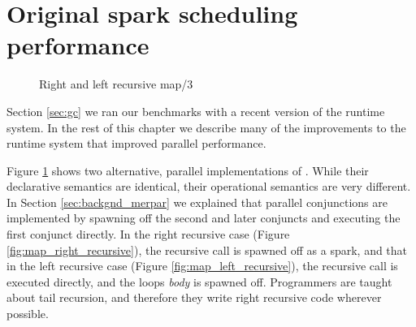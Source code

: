 \section{Original spark scheduling performance}
\label{sec:original_scheduling_performance}


\begin{figure}
\begin{center}
%
\end{center}
\caption{Right and left recursive map/3}
\label{fig:map_right_and_left_recursive}
\end{figure}

Section \ref{sec:gc} we ran our benchmarks with a recent version of the
runtime system.
In the rest of this chapter we describe many of the improvements to the
runtime system that improved parallel performance.

Figure \ref{fig:map_right_and_left_recursive} shows two alternative, parallel
implementations of .
While their declarative semantics are identical,
their operational semantics are very different.
In Section \ref{sec:backgnd_merpar} we explained that parallel conjunctions
are implemented by spawning off the second and later conjuncts and executing
the first conjunct directly.
In the right recursive case (Figure \ref{fig:map_right_recursive}),
the recursive call is spawned off as a spark,
and that in the left recursive case (Figure \ref{fig:map_left_recursive}),
the recursive call is executed directly, and the loops \emph{body} is
spawned off.
Programmers are taught about tail recursion,
and therefore they write right recursive code wherever possible.

